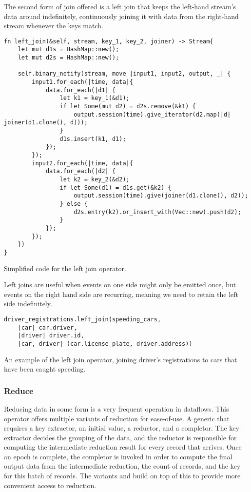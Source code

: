 The second form of join offered is a left join that keeps the left-hand stream's data around indefinitely, continuously joining it with data from the right-hand stream whenever the keys match.

\begin{listing}[H]
\begin{verbatim}
fn left_join(&self, stream, key_1, key_2, joiner) -> Stream{
    let mut d1s = HashMap::new();
    let mut d2s = HashMap::new();

    self.binary_notify(stream, move |input1, input2, output, _| {
        input1.for_each(|time, data|{
            data.for_each(|d1| {
                let k1 = key_1(&d1);
                if let Some(mut d2) = d2s.remove(&k1) {
                    output.session(time).give_iterator(d2.map(|d| joiner(d1.clone(), d)));
                }
                d1s.insert(k1, d1);
            });
        });
        input2.for_each(|time, data|{
            data.for_each(|d2| {
                let k2 = key_2(&d2);
                if let Some(d1) = d1s.get(&k2) {
                    output.session(time).give(joiner(d1.clone(), d2));
                } else {
                    d2s.entry(k2).or_insert_with(Vec::new).push(d2);
                }
            });
        });
    })
}
\end{verbatim}
  \caption{Simplified code for the left join operator.}
  \label{lst:left-join}
\end{listing}

Left joins are useful when events on one side might only be emitted once, but events on the right hand side are recurring, meaning we need to retain the left side indefinitely.

\begin{listing}[H]
\begin{verbatim}
driver_registrations.left_join(speeding_cars,
    |car| car.driver,
    |driver| driver.id,
    |car, driver| (car.license_plate, driver.address))
\end{verbatim}
\caption{An example of the left join operator, joining driver's registrations to cars that have been caught speeding.}
\label{lst:left-join-example}
\end{listing}

\subsubsection{Reduce}
Reducing data in some form is a very frequent operation in dataflows. This operator offers multiple variants of reduction for ease-of-use. A generic  that requires a key extractor, an initial value, a reductor, and a completor. The key extractor decides the grouping of the data, and the reductor is responsible for computing the intermediate reduction result for every record that arrives. Once an epoch is complete, the completor is invoked in order to compute the final output data from the intermediate reduction, the count of records, and the key for this batch of records. The variants  and  build on top of this to provide more convenient access to reduction.

